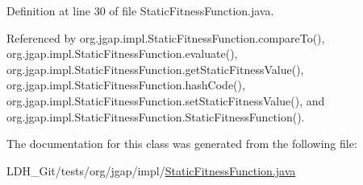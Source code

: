 Definition at line 30 of file Static\-Fitness\-Function.\-java.



Referenced by org.\-jgap.\-impl.\-Static\-Fitness\-Function.\-compare\-To(), org.\-jgap.\-impl.\-Static\-Fitness\-Function.\-evaluate(), org.\-jgap.\-impl.\-Static\-Fitness\-Function.\-get\-Static\-Fitness\-Value(), org.\-jgap.\-impl.\-Static\-Fitness\-Function.\-hash\-Code(), org.\-jgap.\-impl.\-Static\-Fitness\-Function.\-set\-Static\-Fitness\-Value(), and org.\-jgap.\-impl.\-Static\-Fitness\-Function.\-Static\-Fitness\-Function().



The documentation for this class was generated from the following file\-:\begin{DoxyCompactItemize}
\item 
L\-D\-H\-\_\-\-Git/tests/org/jgap/impl/\hyperlink{_static_fitness_function_8java}{Static\-Fitness\-Function.\-java}\end{DoxyCompactItemize}
